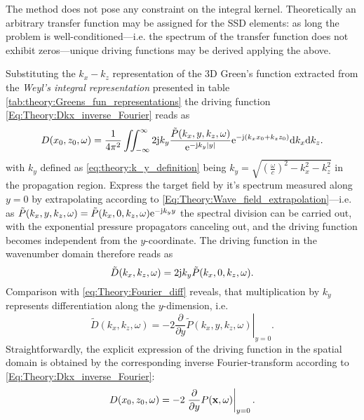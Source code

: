 The method does not pose any constraint on the integral kernel. 
Theoretically an arbitrary transfer function may be assigned for the SSD elements: as long the problem is well-conditioned---i.e. the spectrum of the transfer function does not exhibit zeros---unique driving functions may be derived applying the above.

\vspace{3mm}
Substituting the $k_x-k_z$ representation of the 3D Green's function extracted from the \emph{Weyl's integral representation} \cite{Williams1999, Lalor1969} presented in table \ref{tab:theory:Greens_fun_representations} the driving function \eqref{Eq:Theory:Dkx_inverse_Fourier} reads as
\begin{equation}
D(x_0,z_0,\omega) = \frac{1}{4\pi^2} \iint_{-\infty}^{\infty} 2\mathrm{j} k_y \frac{\tilde{P}(k_x,y,k_z, \omega)}{ \mathrm{e}^{ -\mathrm{j} k_y  | y |  } } \mathrm{e}^{-\mathrm{j} (k_x x_0 + k_z z_0)} \mathrm{d} k_x \mathrm{d} k_z.
\end{equation}
with $k_y$ defined as \eqref{eq:theory:k_y_definition} being $k_y = \sqrt{\left( \frac{\omega}{c}\right)^2 - k_x^2 - k_z^2}$ in the propagation region.	
Express the target field by it's spectrum measured along $y = 0$ by extrapolating according to \eqref{Eq:Theory:Wave_field_extrapolation}---i.e. as 
$
\tilde{P}(k_x,y,k_z, \omega) = \tilde{P}(k_x,0,k_z, \omega)  \mathrm{e}^{ -\mathrm{j} k_y  y }
$
the spectral division can be carried out, with the exponential pressure propagators canceling out, and the driving function becomes independent from the $y$-coordinate. The driving function in the wavenumber domain therefore reads as
\begin{equation}
\tilde{D}(k_x,k_z,\omega) = 2\mathrm{j} k_y \tilde{P}(k_x,0,k_z,\omega).
\label{Eq:Theory:Planar_explicit_driv_fun}
\end{equation}
Comparison with \eqref{eq:Theory:Fourier_diff} reveals, that multiplication by $k_y$ represents differentiation along the $y$-dimension, i.e.
\begin{equation}
\tilde{D}(k_x,k_z,\omega) = -2 \left. \frac{\partial}{\partial y} \tilde{P}(k_x,y,k_z,\omega) \right|_{y = 0}.
\label{Eq:Theory:Planar_explicit_driv_fun_spatial}
\end{equation}
Straightforwardly, the explicit expression of the driving function in the spatial domain is obtained by the corresponding inverse Fourier-transform according to \eqref{Eq:Theory:Dkx_inverse_Fourier}:
\begin{equation}
D(x_0,z_0,\omega) = -2 \left. \frac{\partial}{\partial y} P(\mathbf{x},\omega) \right|_{y = 0}.
\label{Eq:Theory:Planar_explicit_driv_fun_spatial}
\end{equation}

